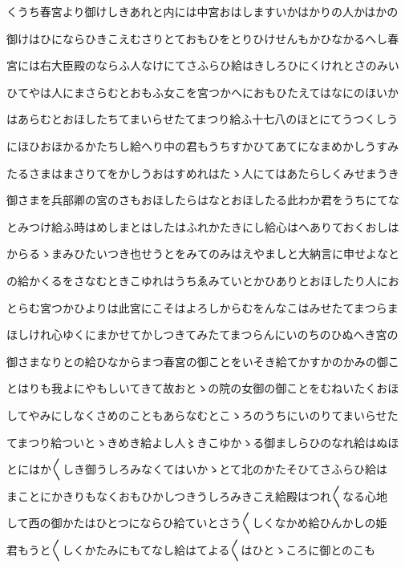 \documentclass[a4paper,11pt,landscape]{ltjtarticle}
\begin{document}
\par\medskip
くうち春宮より御けしきあれと内には中宮おはしますいかはかりの人かはかの
\par\medskip
御けはひにならひきこえむさりとておもひをとりひけせんもかひなかるへし春
\par\medskip
宮には右大臣殿のならふ人なけにてさふらひ給はきしろひにくけれとさのみい
\par\medskip
ひてやは人にまさらむとおもふ女こを宮つかへにおもひたえてはなにのほいか
\par\medskip
はあらむとおほしたちてまいらせたてまつり給ふ十七八のほとにてうつくしう
\par\medskip
にほひおほかるかたちし給へり中の君もうちすかひてあてになまめかしうすみ
\par\medskip
たるさまはまさりてをかしうおはすめれはたゝ人にてはあたらしくみせまうき
\par\medskip
御さまを兵部卿の宮のさもおほしたらはなとおほしたる此わか君をうちにてな
\par\medskip
とみつけ給ふ時はめしまとはしたはふれかたきにし給心はへありておくおしは
\par\medskip
からるゝまみひたいつき也せうとをみてのみはえやましと大納言に申せよなと
\par\medskip
の給かくるをさなむときこゆれはうちゑみていとかひありとおほしたり人にお
\par\medskip
とらむ宮つかひよりは此宮にこそはよろしからむをんなこはみせたてまつらま
\par\medskip
ほしけれ心ゆくにまかせてかしつきてみたてまつらんにいのちのひぬへき宮の
\par\medskip
御さまなりとの給ひなからまつ春宮の御ことをいそき給てかすかのかみの御こ
\par\medskip
とはりも我よにやもしいてきて故おとゝの院の女御の御ことをむねいたくおほ
\par\medskip
してやみにしなくさめのこともあらなむとこゝろのうちにいのりてまいらせた
\par\medskip
てまつり給ついとゝきめき給よし人〻きこゆかゝる御ましらひのなれ給はぬほ
\par\medskip
とにはか〱しき御うしろみなくてはいかゝとて北のかたそひてさふらひ給は
\par\medskip
まことにかきりもなくおもひかしつきうしろみきこえ給殿はつれ〱なる心地
\par\medskip
して西の御かたはひとつにならひ給ていとさう〱しくなかめ給ひんかしの姫
\par\medskip
君もうと〱しくかたみにもてなし給はてよる〱はひとゝころに御とのこも
\par\medskip
\end{document}
